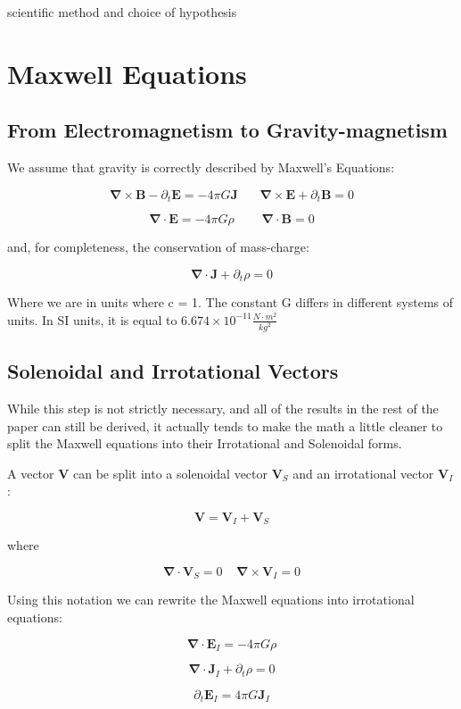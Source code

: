 \documentclass {article}
\renewcommand\vec{\mathbf}
\let\OldS\nabla
\renewcommand{\nabla}{\boldsymbol{\OldS}}
\begin{document}
scientific method and choice of hypothesis


\newpage


\section{Maxwell Equations}
\subsection{From Electromagnetism to Gravity-magnetism}



We assume that gravity is correctly described by Maxwell's Equations:

$$\nabla \times \vec B  - \partial_t \vec E  = -4 \pi G \vec J ~~~~~~~~ \nabla \times \vec E + \partial_t \vec B = 0    $$

$$\nabla \cdot \vec E = -4 \pi G \rho ~~~~~~~~~~ \nabla \cdot \vec B = 0   $$

and, for completeness, the conservation of mass-charge:

$$\nabla \cdot \vec J + \partial_t \rho = 0 $$

Where we are in units where c = 1. The constant G differs in different systems of units. In SI units, it is equal to $6.674 \times 10^{-11} \frac {N \cdot m^2}{kg^2}$ 

\newpage 
\subsection{Solenoidal and Irrotational Vectors}
While this step is not strictly necessary, and all of the results in the rest of the paper can still be derived, it actually tends to make the math a little cleaner to split the Maxwell equations into their Irrotational and Solenoidal forms.

A vector $\vec V$ can be split into a solenoidal vector $\vec V_S$ and an irrotational vector $\vec V_I$:

$$\vec V = \vec V_I + \vec V_S $$

where

$$\nabla \cdot \vec V_S = 0 ~~~~~ \nabla \times \vec V_I = 0 $$

Using this notation we can rewrite the Maxwell equations into irrotational equations:

$$\nabla \cdot \vec E_I = -4 \pi G  \rho$$

$$\nabla \cdot \vec J_I + \partial_t \rho = 0 $$

$$ \partial_t \vec E_I = 4 \pi G \vec J_I $$
\end{document}
